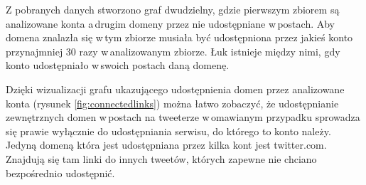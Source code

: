 \par
Z pobranych danych stworzono graf dwudzielny, gdzie pierwszym zbiorem są analizowane konta a\,drugim domeny przez nie udostępniane w\,postach. Aby domena znalazła się w\,tym zbiorze musiała być udostępniona przez jakieś konto przynajmniej 30 razy w\,analizowanym zbiorze. Łuk istnieje między nimi, gdy konto udostępniało w\,swoich postach daną domenę. 
\par
Dzięki wizualizacji grafu ukazującego udostępnienia domen przez analizowane konta (rysunek \ref{fig:connectedlinks}) można łatwo zobaczyć, że udostępnianie zewnętrznych domen w\,postach na tweeterze w\,omawianym przypadku sprowadza się prawie wyłącznie do udostępniania serwisu, do którego to konto należy. Jedyną domeną która jest udostępniana przez kilka kont jest twitter.com. Znajdują się tam linki do innych tweetów, których zapewne nie chciano bezpośrednio udostępnić. 